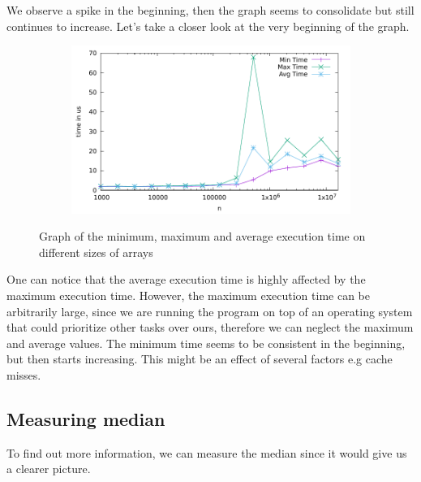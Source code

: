 \documentclass[a4paper,11pt]{article}
\begin{document}
We observe a spike in the beginning, then the graph seems to consolidate but still continues to increase.
Let's take a closer look at the very beginning of the graph.

\begin{figure}[h]
  \centering
  \begin{subfigure}[b]{.5\textwidth}
    \centering
    \includegraphics[width=\textwidth]{./min_max_average/data_2} %
  \end{subfigure}
  \caption{Graph of the minimum, maximum and average execution time on different sizes of arrays}
  \label{fig:graph_2}
\end{figure}

One can notice that the average execution time is highly affected by the maximum execution time.
However, the maximum execution time can be arbitrarily large, since we are running the program on top of an operating system that could prioritize other tasks over ours, therefore we can neglect the maximum and average values.
The minimum time seems to be consistent in the beginning, but then starts increasing.
This might be an effect of several factors e.g cache misses.

\subsection*{Measuring median}

To find out more information, we can measure the median since it would give us a clearer picture.
\end{document}
